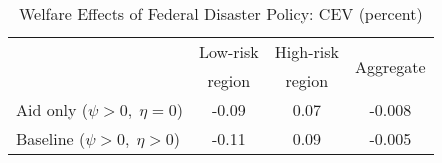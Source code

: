 \begin{table}[H] 
\singlespace 
\center 
\caption{Welfare Effects of Federal Disaster Policy: CEV (percent)} \label{tab:fed_welfare}
\vspace{-.1in} 
\begin{tabular}{l c c c}\hline 
\hline 
 	& Low-risk & High-risk & \multirow{2}{*}{Aggregate} \\[-0.75ex] 
 	& region & region &  \\ 
\hline 
Aid only ($\psi >0, \; \eta =0$) &  \multirow{1}{*}{   -0.09} & \multirow{1}{*}{    0.07} & \multirow{1}{*}{  -0.008}  \\Baseline ($\psi >0, \; \eta >0$) &  \multirow{1}{*}{   -0.11} & \multirow{1}{*}{    0.09} & \multirow{1}{*}{  -0.005}  \\\hline 
\end{tabular}
\end{table} 
